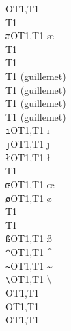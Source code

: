\documentclass{ltxguide}[1994/11/20]
\newcommand\ttverb[1]{\texttt{\string#1}}
\begin{document}
\begin{tabbing}
\ttverb\SS                \>OT1,T1\>   \SS \>               \\
\ttverb\TH                \>T1    \>   \TH \>               \\
\ttverb\ae                \>OT1,T1\>   \ae \>               \\
\ttverb\dh                \>T1    \>   \dh \>               \\
\ttverb\dj                \>T1    \>   \dj \>               \\
\ttverb\guillemotleft     \>T1    \>   \guillemotleft  \> (guillemet) \\
\ttverb\guillemotright    \>T1    \>   \guillemotright \> (guillemet) \\
\ttverb\guilsinglleft     \>T1    \>   \guilsinglleft  \> (guillemet) \\
\ttverb\guilsinglright    \>T1    \>   \guilsinglright \> (guillemet) \\
\ttverb\i                 \>OT1,T1\>   \i  \>               \\
\ttverb\j                 \>OT1,T1\>   \j  \>               \\
\ttverb\l                 \>OT1,T1\>   \l  \>               \\
\ttverb\ng                \>T1    \>   \ng \>               \\
\ttverb\oe                \>OT1,T1\>   \oe \>               \\
\ttverb\o                 \>OT1,T1\>   \o  \>               \\
\ttverb\quotedblbase      \>T1    \>   \quotedblbase   \>   \\
\ttverb\quotesinglbase    \>T1    \>   \quotesinglbase \>   \\
\ttverb\ss                \>OT1,T1\>   \ss \>               \\
\ttverb\textasciicircum   \>OT1,T1\>   \textasciicircum \>  \\
\ttverb\textasciitilde    \>OT1,T1\>   \textasciitilde  \>  \\
\ttverb\textbackslash     \>OT1,T1\>   \textbackslash   \>  \\
\ttverb\textbar           \>OT1,T1\>   \textbar         \>  \\
\ttverb\textbraceleft     \>OT1,T1\>   \textbraceleft   \>  \\
\ttverb\textbraceright    \>OT1,T1\>   \textbraceright  \>  \\

\end{tabbing}
\end{document}
